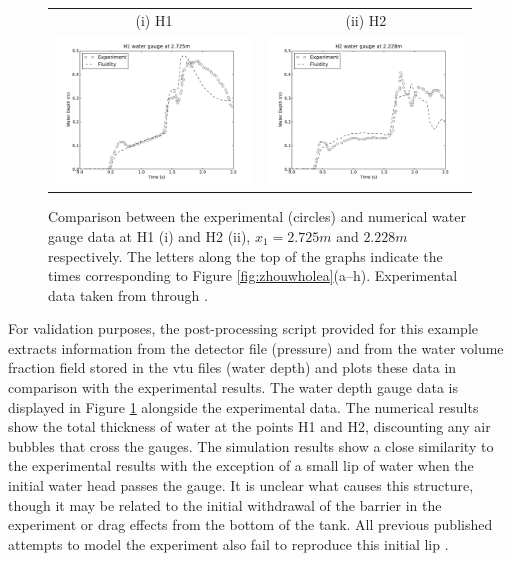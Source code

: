 \begin{figure}[tbp]
\begin{center}
\begin{tabular}{cc}
\hspace{1cm}(i) H1 & (ii) H2  \\
\includegraphics[width=7cm]{examples_images/water_collapse/water_gauge_H1.pdf} & \includegraphics[width=7cm]{examples_images/water_collapse/water_gauge_H2.pdf}\\
\end{tabular}
\caption{Comparison between the experimental (circles) and numerical water gauge data at H1 (i) and H2 (ii), $x_1 = 2.725m$ and $2.228m$ respectively.  The letters along the top of the graphs indicate the times corresponding to Figure \ref{fig:zhouwholea}(a--h).  Experimental data taken from \citet{zhou_nonlinear_1999} through \citet{park_volume-of-fluid_2009}.}
\label{fig:zhoudepth}
\end{center}
\end{figure}

For validation purposes, the post-processing script provided for this example extracts information from the detector file (pressure) and from the water volume fraction field stored in the vtu files (water depth) and plots these data in comparison with the experimental results. The water depth gauge data is displayed in Figure \ref{fig:zhoudepth} alongside the experimental data.  The numerical results show the total thickness of water at the points H1 and H2, discounting any air bubbles that cross the gauges.  The simulation results show a close similarity to the experimental results with the exception of a small lip of water when the initial water head passes the gauge.  It is unclear what causes this structure, though it may be related to the initial withdrawal of the barrier in the experiment or drag effects from the bottom of the tank.  All previous published attempts to model the experiment also fail to reproduce this initial lip \citep{zhou_nonlinear_1999, lee_numerical_2002, colagrossi_numerical_2003, park_volume-of-fluid_2009}.

